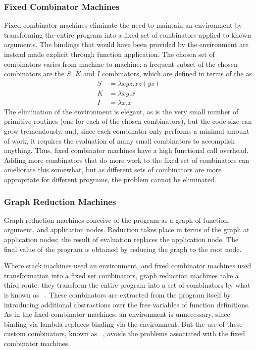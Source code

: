 \subsubsection[Fixed Combinator]{Fixed Combinator Machines}
Fixed combinator machines eliminate the need to maintain an environment by transforming the entire program into a fixed set of combinators applied to known arguments. The bindings that would have been provided by the environment are instead made explicit through function application. The chosen set of combinators varies from machine to machine; a frequent subset of the chosen combinators are the $S$, $K$ and $I$ combinators, which are defined in terms of the \lambdacalc as
\begin{align*}
S &= \lambda xyz. xz (yz)\\
K &= \lambda xy. x\\
I &= \lambda x. x
\end{align*}
The elimination of the environment is elegant, as is the very small number of primitive routines (one for each of the chosen combinators), but the code size can grow tremendously, and, since each combinator only performs a minimal amount of work, it requires the evaluation of many small combinators to accomplish anything. Thus, fixed combinator machines have a high functional call overhead. Adding more combinators that do more work to the fixed set of combinators can ameliorate this somewhat, but as different sets of combinators are more appropriate for different programs, the problem cannot be eliminated.

\subsubsection[Graph Reduction]{Graph Reduction Machines}
Graph reduction machines conceive of the program as a graph of function, argument, and application nodes. Reduction takes place in terms of the graph at application nodes; the result of evaluation replaces the application node. The final value of the program is obtained by reducing the graph to the root node.

Where stack machines used an environment, and fixed combinator machines used transformation into a fixed set combinators, graph reduction machines take a third route: they transform the entire program into a set of combinators by what is known as ~\citep{Johnsson:Lambda:1985,Danvy:Lambda-Lifting:2002,Fischbach:Specification:2003}. These combinators are extracted from the program itself by introducing additional abstractions over the free variables of function definitions. As in the fixed combinator machines, an environment is unnecessary, since binding via lambda replaces binding via the environment. But the use of these custom combinators, known as ~\citep{Hughes:Super-combinators:1982}, avoids the problems associated with the fixed combinator machines.

